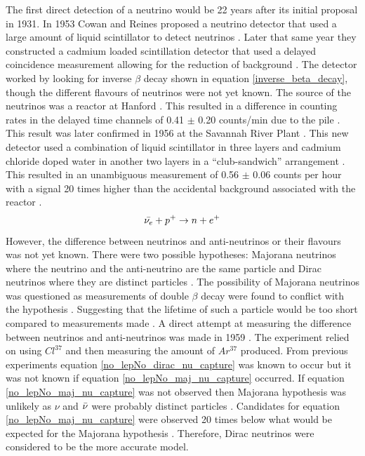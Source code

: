 The first direct detection of a neutrino would be 22 years after its initial proposal in 1931. In 1953 Cowan and Reines proposed a neutrino detector that used a large amount of liquid scintillator to detect neutrinos \cite{reines1953proposed}. Later that same year they constructed a cadmium loaded scintillation detector that used a delayed coincidence measurement allowing for the reduction of background \cite{reines1953proposed} \cite{reines1953detection}. The detector worked by looking for inverse $\beta$ decay shown in equation \ref{inverse_beta_decay}, though the different flavours of neutrinos were not yet known. The source of the neutrinos was a reactor at Hanford \cite{reines1953detection}. This resulted in a difference in counting rates in the delayed time channels of 0.41 $\pm$ 0.20 counts/min due to the pile \cite{reines1953detection}. This result was later confirmed in 1956 at the Savannah River Plant \cite{Cowan1956Confirmation}. This new detector used a combination of liquid scintillator in three layers and cadmium chloride doped water in another two layers in a ``club-sandwich'' arrangement \cite{Cowan1956Confirmation}. This resulted in an unambiguous measurement of 0.56 $\pm$ 0.06 counts per hour with a signal 20 times higher than the accidental background associated with the reactor \cite{Cowan1956Confirmation}. 
\begin{equation}
    \Bar{\nu_e} + p^+ \rightarrow n + e^+
    \label{inverse_beta_decay}
\end{equation}
However, the difference between neutrinos and anti-neutrinos or their flavours was not yet known. There were two possible hypotheses: Majorana neutrinos where the neutrino and the anti-neutrino are the same particle and Dirac neutrinos where they are distinct particles \cite{griffiths2008book} \cite{griffiths2008neutrino1.5} \cite{cowan1957test}. The possibility of Majorana neutrinos was questioned as measurements of double $\beta$ decay were found to conflict with the hypothesis \cite{cowan1957test}. Suggesting that the lifetime of such a particle would be too short compared to measurements made \cite{cowan1957test}. A direct attempt at measuring the difference between neutrinos and anti-neutrinos was made in 1959 \cite{davis1959attempt}. The experiment relied on using $Cl^{37}$ and then measuring the amount of $Ar^{37}$ produced. From previous experiments \cite{Cowan1956Confirmation} equation \ref{no_lepNo_dirac_nu_capture} was known to occur but it was not known if equation \ref{no_lepNo_maj_nu_capture} occurred. If equation \ref{no_lepNo_maj_nu_capture} was not observed then Majorana hypothesis was unlikely as $\nu$ and $\Bar{\nu}$ were probably distinct particles \cite{griffiths2008book} \cite{griffiths2008neutrino1.5} \cite{davis1959attempt}. Candidates for equation \ref{no_lepNo_maj_nu_capture} were observed 20 times below what would be expected for the Majorana hypothesis \cite{davis1959attempt}. Therefore, Dirac neutrinos were considered to be the more accurate model. 
